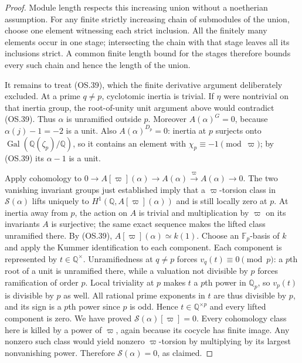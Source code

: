 \begin{proof}
Module length respects this increasing union without a noetherian
assumption.  For any finite strictly increasing chain of submodules
of the union, choose one element witnessing each strict inclusion.
All the finitely many elements occur in one stage; intersecting the
chain with that stage leaves all its inclusions strict.
A common finite length bound for the stages therefore bounds every
such chain and hence the length of the union.

It remains to treat (OS.39), which the finite derivative argument
deliberately excluded.  At a prime $q\ne p$, cyclotomic inertia is
trivial.  If $\eta$ were nontrivial on that inertia group, the
root-of-unity unit argument above would contradict (OS.39).
Thus $\alpha$ is unramified outside $p$.
Moreover $A(\alpha)^G=0$, because $\alpha(j)-1=-2$ is a unit.
Also $A(\alpha)^{D_p}=0$: inertia at $p$ surjects onto
$\operatorname{Gal}(\mathbb Q(\zeta_p)/\mathbb Q)$, so it contains
an element with $\chi_p\equiv-1\pmod\varpi$; by (OS.39) its
$\alpha-1$ is a unit.

Apply cohomology to
$0\to A[\varpi](\alpha)\to A(\alpha)
\xrightarrow{\varpi}A(\alpha)\to0$.
The two vanishing invariant groups just established imply that a
$\varpi$-torsion class in $\mathscr S(\alpha)$ lifts uniquely to
$H^1(\mathbb Q,A[\varpi](\alpha))$ and is still locally zero at
$p$.  At inertia away from $p$, the action on $A$ is trivial and
multiplication by $\varpi$ on its invariants $A$ is surjective;
the same exact sequence makes the lifted class unramified there.
By (OS.39), $A[\varpi](\alpha)\simeq k(1)$.
Choose an $\mathbb F_p$-basis of $k$ and apply the Kummer
identification to each component.  Each component is represented
by $t\in\mathbb Q^\times$.
Unramifiedness at $q\ne p$ forces $v_q(t)\equiv0\pmod p$:
a $p$th root of a unit is unramified there, while a valuation not
divisible by $p$ forces ramification of order $p$.
Local triviality at $p$ makes $t$ a $p$th power in $\mathbb Q_p$,
so $v_p(t)$ is divisible by $p$ as well.
All rational prime exponents in $t$ are thus divisible by $p$,
and its sign is a $p$th power since $p$ is odd.
Hence $t\in\mathbb Q^{\times p}$ and every lifted component is zero.
We have proved $\mathscr S(\alpha)[\varpi]=0$.
Every cohomology class here is killed by a power of $\varpi$,
again because its cocycle has finite image.  Any nonzero such class
would yield nonzero $\varpi$-torsion by multiplying by its largest
nonvanishing power.  Therefore $\mathscr S(\alpha)=0$, as claimed.
\end{proof}

